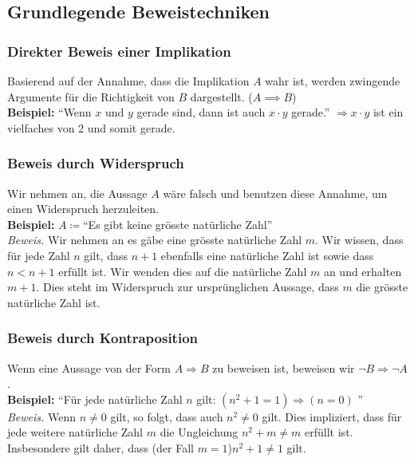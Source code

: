\subsection{Grundlegende Beweistechniken}
	
\subsubsection{Direkter Beweis einer Implikation}
\begin{minipage}{0.9\linewidth}
Basierend auf der Annahme, dass die Implikation $A$ wahr ist, werden zwingende Argumente für die Richtigkeit von $B$ dargestellt. ($A \implies B$) \\
\textbf{Beispiel:} ``Wenn $x$ und $y$ gerade sind, dann ist auch $x \cdot y$ gerade.''
$\Rightarrow x \cdot y$ ist ein vielfaches von 2 und somit gerade.
\end{minipage}
	
\subsubsection{Beweis durch Widerspruch}
\begin{minipage}{0.9\linewidth}
Wir nehmen an, die Aussage $A$ wäre falsch und benutzen diese Annahme, um einen Widerspruch herzuleiten.\\ 
\textbf{Beispiel:} $A\coloneqq$``Es gibt keine grösste natürliche Zahl''\\
\textit{Beweis.} Wir nehmen an es gäbe eine grösste natürliche Zahl $m$.
Wir wissen, dass für jede Zahl $n$ gilt, dass $n+1$ ebenfalls eine natürliche Zahl ist sowie dass $n<n+1$ erfüllt ist. Wir wenden dies auf die natürliche Zahl $m$ an und erhalten $m+1$. Dies steht im Widerspruch zur ursprünglichen Aussage, dass $m$ die grösste natürliche Zahl ist.
\end{minipage}

\subsubsection{Beweis durch Kontraposition}
\begin{minipage}{0.9\linewidth}
Wenn eine Aussage von der Form $A \Rightarrow B$ zu beweisen ist, beweisen wir $\neg B \Rightarrow \neg A$. \\
\textbf{Beispiel:} ``Für jede natürliche Zahl $n$ gilt: $(n^2+1=1) \Rightarrow (n=0)$ '' \\
\textit{Beweis.} Wenn $n\neq 0$ gilt, so folgt, dass auch $n^2 \neq 0$ gilt. Dies impliziert, dass für jede weitere natürliche Zahl $m$ die Ungleichung $n^2 + m \neq m$ erfüllt ist. Insbesondere gilt daher, dass (der Fall $m=1$)$n^2+1\neq 1$ gilt.
\end{minipage}

